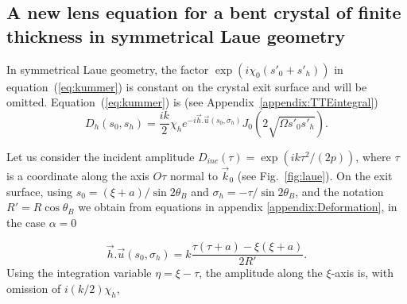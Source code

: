 \documentclass[preprint]{iucr}              %
\begin{document}
\subsection{A new lens equation for a bent crystal of finite thickness in symmetrical Laue geometry}
\label{sec:LaueNewCLE}

In symmetrical Laue geometry, the factor $\exp(i \chi_0 (s'_0+s'_h))$ in equation~(\ref{eq:kummer}) is constant on the crystal exit surface and will be omitted. Equation~(\ref{eq:kummer}) is (see Appendix~\ref{appendix:TTEintegral})
\begin{equation}
\label{eq:DhSymmetricalLaue}
    D_h(s_0,s_h) = \frac{i k}{2} \chi_h e^{-i \vec h . \vec u(s_0,\sigma_h)}
    J_0(2\sqrt{\Omega s'_0 s'_h}).
\end{equation}

Let us consider the incident amplitude $D_{inc}(\tau)=\exp(i k \tau^2/(2p))$, where $\tau$ is a coordinate along the axis $O\tau$ normal to $\vec k_0$ (see Fig.~\ref{fig:laue}). On the exit surface, using $s_0=(\xi+a)/\sin2\theta_B$ and $\sigma_h=-\tau/\sin2\theta_B$, and the notation $R'=R\cos\theta_B$ we obtain from equations in appendix \ref{appendix:Deformation}, in the case $\alpha=0$

\begin{equation}
    \vec h . \vec u(s_0,\sigma_h) = k \frac{\tau(\tau+a)-\xi(\xi+a)}{ 2R'}.
\end{equation}
Using the integration variable $\eta=\xi-\tau$, the amplitude along the $\xi$-axis is, with omission of $i(k/2)\chi_h$,
\end{document}

